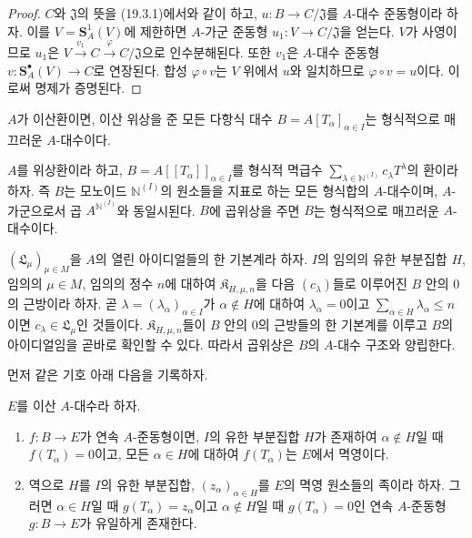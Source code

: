\begin{proof}
$C$와 $\mathfrak J$의 뜻을 (19.3.1)에서와 같이 하고,
$u:B\to C/\mathfrak J$를 $A$-대수 준동형이라 하자. 이를
$V=\mathbf S_A^1(V)$에 제한하면 $A$-가군 준동형
$u_1:V\to C/\mathfrak J$을 얻는다. $V$가 사영이므로 $u_1$은
$V\xrightarrow{v_1}C\xrightarrow{\varphi}C/\mathfrak J$으로
인수분해된다. 또한 $v_1$은 $A$-대수 준동형
$v:\mathbf S_A^\bullet(V)\to C$로 연장된다. 합성
$\varphi\circ v$는 $V$ 위에서 $u$와 일치하므로
$\varphi\circ v=u$이다. 이로써 명제가 증명된다.
\end{proof}

\begin{corollary}[19.3.3]
\label{0.19.3.3-fr}
$A$가 이산환이면, 이산 위상을 준 모든 다항식 대수
$B=A[T_\alpha]_{\alpha\in I}$는 형식적으로 매끄러운 $A$-대수이다.
\end{corollary}

\begin{proposition}[19.3.4]
\label{0.19.3.4-fr}
$A$를 위상환이라 하고,
$B=A[[T_\alpha]]_{\alpha\in I}$를 형식적 멱급수
$\sum_{\lambda\in\mathbb{N}^{(I)}}c_\lambda T^\lambda$의 환이라 하자.
즉 $B$는 모노이드 $\mathbb{N}^{(I)}$의 원소들을 지표로 하는 모든
형식합의 $A$-대수이며, $A$-가군으로서 곱
$A^{\mathbb{N}^{(I)}}$와 동일시된다. $B$에 곱위상을 주면 $B$는
형식적으로 매끄러운 $A$-대수이다.
\end{proposition}

$(\mathfrak L_\mu)_{\mu\in M}$을 $A$의 열린 아이디얼들의 한 기본계라
하자. $I$의 임의의 유한 부분집합 $H$, 임의의 $\mu\in M$, 임의의 정수
$n$에 대하여 $\mathfrak K_{H,\mu,n}$을 다음 $(c_\lambda)$들로 이루어진
$B$ 안의 $0$의 근방이라 하자. 곧
$\lambda=(\lambda_\alpha)_{\alpha\in I}$가 $\alpha\notin H$에 대하여
$\lambda_\alpha=0$이고
$\sum_{\alpha\in H}\lambda_\alpha\leq n$이면
$c_\lambda\in\mathfrak L_\mu$인 것들이다.
$\mathfrak K_{H,\mu,n}$들이 $B$ 안의 $0$의 근방들의 한 기본계를 이루고
$B$의 아이디얼임을 곧바로 확인할 수 있다. 따라서 곱위상은 $B$의
$A$-대수 구조와 양립한다.

먼저 같은 기호 아래 다음을 기록하자.
\begin{lemma}[19.3.4.1]
\label{0.19.3.4.1-fr}
$E$를 이산 $A$-대수라 하자.
\begin{enumerate}
  \item[(i)] $f:B\to E$가 연속 $A$-준동형이면, $I$의 유한 부분집합
  $H$가 존재하여 $\alpha\notin H$일 때 $f(T_\alpha)=0$이고, 모든
  $\alpha\in H$에 대하여 $f(T_\alpha)$는 $E$에서 멱영이다.
  \item[(ii)] 역으로 $H$를 $I$의 유한 부분집합,
  $(z_\alpha)_{\alpha\in H}$를 $E$의 멱영 원소들의 족이라 하자. 그러면
  $\alpha\in H$일 때 $g(T_\alpha)=z_\alpha$이고 $\alpha\notin H$일 때
  $g(T_\alpha)=0$인 연속 $A$-준동형 $g:B\to E$가 유일하게 존재한다.
\end{enumerate}
\end{lemma}

